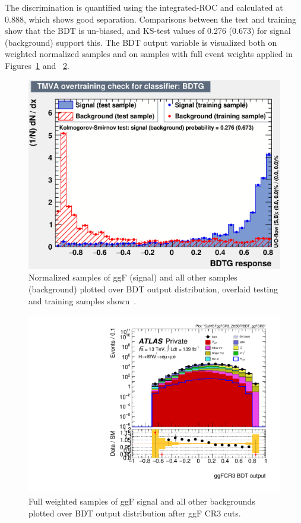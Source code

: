 The discrimination is quantified using the integrated-ROC and calculated at 0.888, which shows good separation. Comparisons between the test and training show that the BDT is un-biased, and KS-test values of 0.276 (0.673) for signal (background) support this. The BDT output variable is visualized both on weighted normalized samples and on samples with full event weights applied in Figures~\ref{fig:ggFCR3BDTresult} and ~\ref{fig:ggFCR3BDTresult2}.

\begin{figure}[!htbp]
\centering
  \includegraphics[width=.45\linewidth]{Pictures/ggFCR3/overtrain_BDTG.eps}
\caption{Normalized samples of ggF (signal) and all other samples (background) plotted over BDT output distribution, overlaid testing and training samples shown~\cite{ourSupportNote}.}
\label{fig:ggFCR3BDTresult}
\end{figure}

\begin{figure}[!htbp]
\centering
  \includegraphics[width=.45\linewidth]{Pictures/run2-emme-CutVBFggFCR3_ZttBDT-BDT_ggFCR3-log.pdf}
\caption{Full weighted samples of ggF signal and all other backgrounds plotted over BDT output distribution after ggF CR3 cuts.}
\label{fig:ggFCR3BDTresult2}
\end{figure}

\newpage
